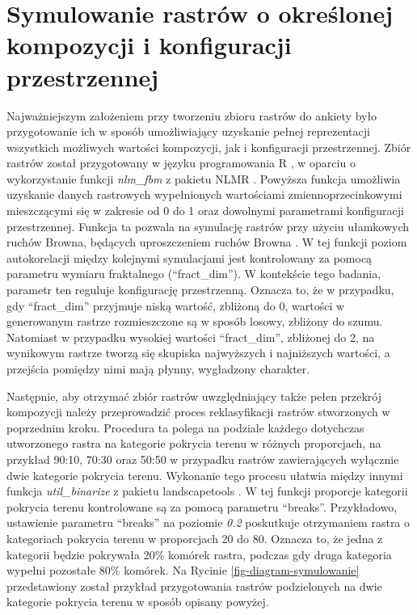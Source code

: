 \documentclass{amuthesis}
\begin{document}
\hypertarget{symulowanie-rastruxf3w-o-okreux15blonej-kompozycji-i-konfiguracji-przestrzennej}{%
\section{Symulowanie rastrów o określonej kompozycji i konfiguracji
przestrzennej}\label{symulowanie-rastruxf3w-o-okreux15blonej-kompozycji-i-konfiguracji-przestrzennej}}

Najważniejszym założeniem przy tworzeniu zbioru rastrów do ankiety było
przygotowanie ich w sposób umożliwiający uzyskanie pełnej reprezentacji
wszystkich możliwych wartości kompozycji, jak i konfiguracji
przestrzennej. Zbiór rastrów został przygotowany w języku programowania
R \autocite{R2023}, w oparciu o wykorzystanie funkcji \emph{nlm\_fbm} z
pakietu NLMR \autocite{NLMR2018}. Powyższa funkcja umożliwia uzyskanie
danych rastrowych wypełnionych wartościami zmiennoprzecinkowymi
mieszczącymi się w zakresie od 0 do 1 oraz dowolnymi parametrami
konfiguracji przestrzennej. Funkcja ta pozwala na symulację rastrów przy
użyciu ułamkowych ruchów Browna, będących uproszczeniem ruchów Browna
\autocite{nlm_fbm}. W tej funkcji poziom autokorelacji między kolejnymi
symulacjami jest kontrolowany za pomocą parametru wymiaru fraktalnego
(``fract\_dim''). W kontekście tego badania, parametr ten reguluje
konfigurację przestrzenną. Oznacza to, że w przypadku, gdy
``fract\_dim'' przyjmuje niską wartość, zbliżoną do 0, wartości w
generowanym rastrze rozmieszczone są w sposób losowy, zbliżony do szumu.
Natomiast w przypadku wysokiej wartości ``fract\_dim'', zbliżonej do 2,
na wynikowym rastrze tworzą się skupiska najwyższych i najniższych
wartości, a przejścia pomiędzy nimi mają płynny, wygładzony charakter.

Następnie, aby otrzymać zbiór rastrów uwzględniający także pełen
przekrój kompozycji należy przeprowadzić proces reklasyfikacji rastrów
stworzonych w poprzednim kroku. Procedura ta polega na podziale każdego
dotychczas utworzonego rastra na kategorie pokrycia terenu w różnych
proporcjach, na przykład 90:10, 70:30 oraz 50:50 w przypadku rastrów
zawierających wyłącznie dwie kategorie pokrycia terenu. Wykonanie tego
procesu ułatwia między innymi funkcja \emph{util\_binarize} z pakietu
landscapetools \autocite{NLMR2018}. W tej funkcji proporcje kategorii
pokrycia terenu kontrolowane są za pomocą parametru ``breaks''.
Przykładowo, ustawienie parametru ``breaks'' na poziomie \emph{0.2}
poskutkuje otrzymaniem rastra o kategoriach pokrycia terenu w
proporcjach 20 do 80. Oznacza to, że jedna z kategorii będzie pokrywała
20\% komórek rastra, podczas gdy druga kategoria wypełni pozostałe 80\%
komórek. Na Rycinie \ref{fig-diagram-symulowanie} przedstawiony został
przykład przygotowania rastrów podzielonych na dwie kategorie pokrycia
terenu w sposób opisany powyżej.
\end{document}
